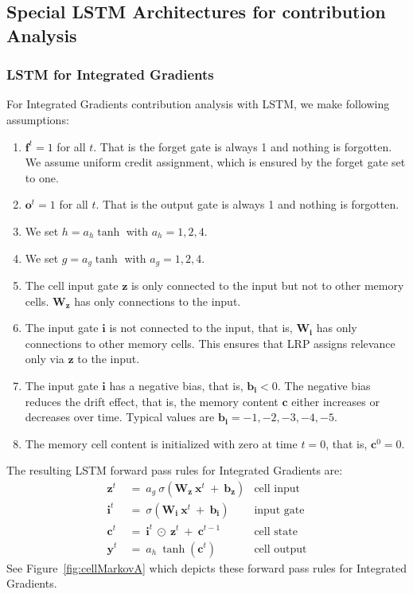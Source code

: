 \documentclass{article}
\newcommand\Bb{\bm{b}}
\newcommand\Bc{\bm{c}}
\newcommand\Bf{\bm{f}}
\newcommand\Bi{\bm{i}}
\newcommand\Bo{\bm{o}}
\newcommand\Bx{\bm{x}}
\newcommand\By{\bm{y}}
\newcommand\Bz{\bm{z}}
\newcommand\BW{\bm{W}}
\begin{document}
\begin{appendices}
\subsection{Special LSTM Architectures for contribution Analysis}
\label{sec:ALSTMadjust}


\subsubsection{LSTM for Integrated Gradients}

For Integrated Gradients contribution analysis with LSTM, 
we make following assumptions:
\begin{enumerate}[label=\textbf{(A\arabic*)}]
\item $\Bf^t=1$ for all $t$. That is the forget gate is always 1 and
  nothing is forgotten. We assume uniform credit assignment, which
  is ensured by the forget gate set to one.

\item $\Bo^t=1$ for all $t$. That is the output gate is always 1 and
  nothing is forgotten. 

\item We set $h=a_h \tanh$ with $a_h=1,2,4$.

\item We set $g=a_g \tanh$ with $a_g=1,2,4$.

\item The cell input gate $\Bz$ is only connected to the input but not
  to other memory cells.  $\BW_{\Bz}$ has only connections to the
  input. 

\item The input gate $\Bi$ is not connected to the input, that is,
  $\BW_{\Bi}$ has only connections to other memory cells. This ensures
  that LRP assigns relevance only via $\Bz$ to the input.


\item The input gate $\Bi$ has a negative bias, that is,
  $\Bb_{\Bi}<0$. The negative bias
  reduces the drift effect, that is, the memory 
  content $\Bc$ either increases or decreases over time.
  Typical values are $\Bb_{\Bi}=-1,-2,-3,-4,-5$.

\item The memory cell content is initialized with zero at time $t=0$,
  that is, $\Bc^0=0$.
 
\end{enumerate}

The resulting LSTM forward pass rules for Integrated Gradients are:
\begin{align}
\Bz^t \ &= \ a_g \ \sigma \left( \BW_{\Bz} \ \Bx^t \ + \
   \Bb_{\Bz}\right) & \text{cell input} \\
\Bi^t \ &= \ \sigma \left( \BW_{\Bi} \ \Bx^t \ + \
    \Bb_{\Bi} \right) & \text{input gate} \\
\Bc^t \ &= \  \Bi^t \ \odot \ \Bz^t \ + \ \Bc^{t-1} & \text{cell state} \\
\By^t \ &= \ a_h \ \tanh\left( \Bc^t \right) &
\text{cell output}
\end{align}
See Figure~\ref{fig:cellMarkovA} which depicts these  
forward pass rules for Integrated Gradients. 



\end{appendices}
\end{document}
